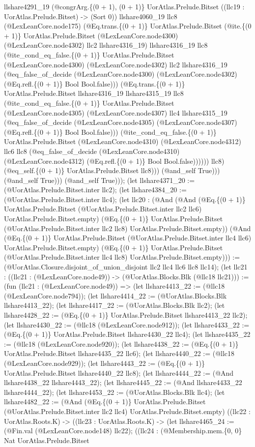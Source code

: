 \documentclass[11pt]{article}
\begin{document}
llshare4291\_19 (@congrArg.\{(0 + 1), (0 + 1)\} UorAtlas.Prelude.Bitset ((llc19 : UorAtlas.Prelude.Bitset) -> (Sort 0)) llshare4060\_19 llc8 (@LexLeanCore.node175) (@Eq.trans.\{(0 + 1)\} UorAtlas.Prelude.Bitset (@ite.\{(0 + 1)\} UorAtlas.Prelude.Bitset (@LexLeanCore.node4300) (@LexLeanCore.node4302) llc2 llshare4316\_19) llshare4316\_19 llc8 (@ite\_cond\_eq\_false.\{(0 + 1)\} UorAtlas.Prelude.Bitset (@LexLeanCore.node4300) (@LexLeanCore.node4302) llc2 llshare4316\_19 (@eq\_false\_of\_decide (@LexLeanCore.node4300) (@LexLeanCore.node4302) (@Eq.refl.\{(0 + 1)\} Bool Bool.false))) (@Eq.trans.\{(0 + 1)\} UorAtlas.Prelude.Bitset llshare4316\_19 llshare4315\_19 llc8 (@ite\_cond\_eq\_false.\{(0 + 1)\} UorAtlas.Prelude.Bitset (@LexLeanCore.node4305) (@LexLeanCore.node4307) llc4 llshare4315\_19 (@eq\_false\_of\_decide (@LexLeanCore.node4305) (@LexLeanCore.node4307) (@Eq.refl.\{(0 + 1)\} Bool Bool.false))) (@ite\_cond\_eq\_false.\{(0 + 1)\} UorAtlas.Prelude.Bitset (@LexLeanCore.node4310) (@LexLeanCore.node4312) llc6 llc8 (@eq\_false\_of\_decide (@LexLeanCore.node4310) (@LexLeanCore.node4312) (@Eq.refl.\{(0 + 1)\} Bool Bool.false)))))) llc8) (@eq\_self.\{(0 + 1)\} UorAtlas.Prelude.Bitset llc8))) (@and\_self True))) (@and\_self True))) (@and\_self True))); (let llshare4371\_20 := (@UorAtlas.Prelude.Bitset.inter llc2); (let llshare4384\_20 := (@UorAtlas.Prelude.Bitset.inter llc4); (let llc20 : (@And (@And (@Eq.\{(0 + 1)\} UorAtlas.Prelude.Bitset (@UorAtlas.Prelude.Bitset.inter llc2 llc6) UorAtlas.Prelude.Bitset.empty) (@Eq.\{(0 + 1)\} UorAtlas.Prelude.Bitset (@UorAtlas.Prelude.Bitset.inter llc2 llc8) UorAtlas.Prelude.Bitset.empty)) (@And (@Eq.\{(0 + 1)\} UorAtlas.Prelude.Bitset (@UorAtlas.Prelude.Bitset.inter llc4 llc6) UorAtlas.Prelude.Bitset.empty) (@Eq.\{(0 + 1)\} UorAtlas.Prelude.Bitset (@UorAtlas.Prelude.Bitset.inter llc4 llc8) UorAtlas.Prelude.Bitset.empty))) := (@UorAtlas.Closure.disjoint\_of\_union\_disjoint llc2 llc4 llc6 llc8 llc14); (let llc21 : ((llc21 : (@LexLeanCore.node49)) -> (@UorAtlas.Blocks.Blk (@llc18 llc21))) := (fun (llc21 : (@LexLeanCore.node49)) => (let llshare4413\_22 := (@llc18 (@LexLeanCore.node794)); (let llshare4414\_22 := (@UorAtlas.Blocks.Blk llshare4413\_22); (let llshare4417\_22 := (@UorAtlas.Blocks.Blk llc2); (let llshare4428\_22 := (@Eq.\{(0 + 1)\} UorAtlas.Prelude.Bitset llshare4413\_22 llc2); (let llshare4430\_22 := (@llc18 (@LexLeanCore.node912)); (let llshare4433\_22 := (@Eq.\{(0 + 1)\} UorAtlas.Prelude.Bitset llshare4430\_22 llc4); (let llshare4435\_22 := (@llc18 (@LexLeanCore.node920)); (let llshare4438\_22 := (@Eq.\{(0 + 1)\} UorAtlas.Prelude.Bitset llshare4435\_22 llc6); (let llshare4440\_22 := (@llc18 (@LexLeanCore.node929)); (let llshare4443\_22 := (@Eq.\{(0 + 1)\} UorAtlas.Prelude.Bitset llshare4440\_22 llc8); (let llshare4444\_22 := (@And llshare4438\_22 llshare4443\_22); (let llshare4445\_22 := (@And llshare4433\_22 llshare4444\_22); (let llshare4453\_22 := (@UorAtlas.Blocks.Blk llc4); (let llshare4482\_22 := (@And (@Eq.\{(0 + 1)\} UorAtlas.Prelude.Bitset (@UorAtlas.Prelude.Bitset.inter llc2 llc4) UorAtlas.Prelude.Bitset.empty) ((llc22 : UorAtlas.Roots.K) -> ((llc23 : UorAtlas.Roots.K) -> (let llshare4465\_24 := (@Fin.val (@LexLeanCore.node148) llc22); ((llc24 : (@Membership.mem.\{0, 0\} Nat UorAtlas.Prelude.Bitset 
\end{document}
